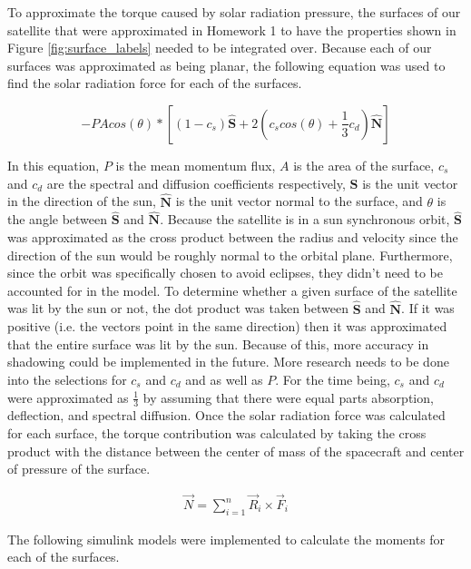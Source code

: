 To approximate the torque caused by solar radiation pressure, the surfaces of our satellite that were approximated in Homework 1 to have the properties shown in Figure \ref{fig:surface_labels} needed to be integrated over. Because each of our surfaces was approximated as being planar, the following equation was used to find the solar radiation force for each of the surfaces.

\begin{equation}
    - P A cos(\theta) * \left [ (1-c_s)\hat{\boldsymbol{S}} + 2 \left( c_s cos(\theta) + \frac{1}{3} c_d \right) \hat{\boldsymbol{N}} \right]
\end{equation}

In this equation, $P$ is the mean momentum flux, $A$ is the area of the surface, $c_s$ and $c_d$ are the spectral and diffusion coefficients respectively, $\hat{\boldsymbol{S}}$ is the unit vector in the direction of the sun, $\hat{\boldsymbol{N}}$ is the unit vector normal to the surface, and $\theta$ is the angle between $\hat{\boldsymbol{S}}$ and $\hat{\boldsymbol{N}}$. Because the satellite is in a sun synchronous orbit, $\hat{\boldsymbol{S}}$ was approximated as the cross product between the radius and velocity since the direction of the sun would be roughly normal to the orbital plane. Furthermore, since the orbit was specifically chosen to avoid eclipses, they didn't need to be accounted for in the model. To determine whether a given surface of the satellite was lit by the sun or not, the dot product was taken between $\hat{\boldsymbol{S}}$ and $\hat{\boldsymbol{N}}$. If it was positive (i.e. the vectors point in the same direction) then it was approximated that the entire surface was lit by the sun. Because of this, more accuracy in shadowing could be implemented in the future. More research needs to be done into the selections for $c_s$ and $c_d$ and as well as $P$. For the time being, $c_s$ and $c_d$ were approximated as $\frac{1}{3}$ by assuming that there were equal parts absorption, deflection, and spectral diffusion. Once the solar radiation force was calculated for each surface, the torque contribution was calculated by taking the cross product with the distance between the center of mass of the spacecraft and center of pressure of the surface. 

\begin{eqnarray} \label{eqn:torqueFromForce}
    \vec N = \sum^n_{i=1} \vec R_i \times \vec F_i
\end{eqnarray}

The following simulink models were implemented to calculate the moments for each of the surfaces.

